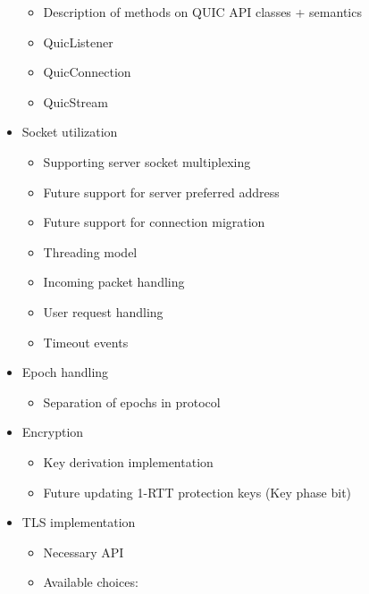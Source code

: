 \begin{itemize}
\begin{itemize}
        \item Description of methods on QUIC API classes + semantics
        \item QuicListener
        \item QuicConnection
        \item QuicStream

    \end{itemize}

    \item Socket utilization
    \begin{itemize}

        \item Supporting server socket multiplexing
        \item Future support for server preferred address
        \item Future support for connection migration
        \item Threading model
        \item Incoming packet handling
        \item User request handling
        \item Timeout events

    \end{itemize}

    \item Epoch handling
    \begin{itemize}
        \item Separation of epochs in protocol
    \end{itemize}

    \item Encryption
    \begin{itemize}

        \item Key derivation implementation
        \item Future updating 1-RTT protection keys (Key phase bit)

    \end{itemize}

    \item TLS implementation

    \begin{itemize}

        \item Necessary API
        \item Available choices:
        \begin{itemize}


\end{itemize}
\end{itemize}
\end{itemize}

